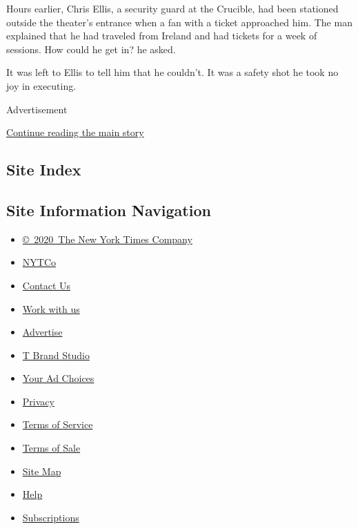 Hours earlier, Chris Ellis, a security guard at the Crucible, had been
stationed outside the theater's entrance when a fan with a ticket
approached him. The man explained that he had traveled from Ireland and
had tickets for a week of sessions. How could he get in? he asked.

It was left to Ellis to tell him that he couldn't. It was a safety shot
he took no joy in executing.

Advertisement

\protect\hyperlink{after-bottom}{Continue reading the main story}

\hypertarget{site-index}{%
\subsection{Site Index}\label{site-index}}

\hypertarget{site-information-navigation}{%
\subsection{Site Information
Navigation}\label{site-information-navigation}}

\begin{itemize}
\tightlist
\item
  \href{https://help.nytimes.com/hc/en-us/articles/115014792127-Copyright-notice}{©~2020~The
  New York Times Company}
\end{itemize}

\begin{itemize}
\tightlist
\item
  \href{https://www.nytco.com/}{NYTCo}
\item
  \href{https://help.nytimes.com/hc/en-us/articles/115015385887-Contact-Us}{Contact
  Us}
\item
  \href{https://www.nytco.com/careers/}{Work with us}
\item
  \href{https://nytmediakit.com/}{Advertise}
\item
  \href{http://www.tbrandstudio.com/}{T Brand Studio}
\item
  \href{https://www.nytimes.com/privacy/cookie-policy\#how-do-i-manage-trackers}{Your
  Ad Choices}
\item
  \href{https://www.nytimes.com/privacy}{Privacy}
\item
  \href{https://help.nytimes.com/hc/en-us/articles/115014893428-Terms-of-service}{Terms
  of Service}
\item
  \href{https://help.nytimes.com/hc/en-us/articles/115014893968-Terms-of-sale}{Terms
  of Sale}
\item
  \href{https://spiderbites.nytimes.com}{Site Map}
\item
  \href{https://help.nytimes.com/hc/en-us}{Help}
\item
  \href{https://www.nytimes.com/subscription?campaignId=37WXW}{Subscriptions}
\end{itemize}
